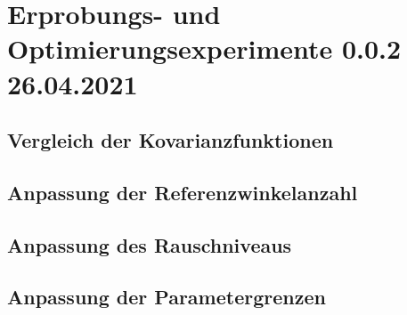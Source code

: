 %

\chapter{Erprobungs- und Optimierungsexperimente 0.0.2 26.04.2021}\label{ch:erprobungs-u-opt-exp}
	
	
\section{Vergleich der Kovarianzfunktionen}\label{sec:exp1}


\section{Anpassung der Referenzwinkelanzahl}\label{sec:exp2}


\section{Anpassung des Rauschniveaus}\label{sec:exp3}


\section{Anpassung der Parametergrenzen}\label{sec:exp4}
	
